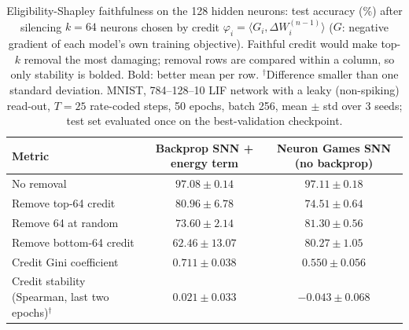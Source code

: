 \documentclass{article}
\begin{document}
\begin{table}[H]
\centering
\small
\caption{Eligibility-Shapley faithfulness on the 128 hidden neurons: test accuracy (\%) after silencing $k=64$ neurons chosen by credit $\varphi_i = \langle G_i, \Delta W_i^{(n-1)} \rangle$ ($G$: negative gradient of each model's own training objective). Faithful credit would make top-$k$ removal the most damaging; removal rows are compared within a column, so only stability is bolded. Bold: better mean per row. $^\dagger$Difference smaller than one standard deviation. MNIST, 784--128--10 LIF network with a leaky (non-spiking) read-out, $T=25$ rate-coded steps, 50 epochs, batch 256, mean $\pm$ std over 3 seeds; test set evaluated once on the best-validation checkpoint.}
\label{tab:t2-explain}
\begin{tabular}{lcc}
\toprule
Metric & Backprop SNN + energy term & Neuron Games SNN (no backprop) \\
\midrule
No removal & $97.08 \pm 0.14$ & $97.11 \pm 0.18$ \\
Remove top-64 credit & $80.96 \pm 6.78$ & $74.51 \pm 0.64$ \\
Remove 64 at random & $73.60 \pm 2.14$ & $81.30 \pm 0.56$ \\
Remove bottom-64 credit & $62.46 \pm 13.07$ & $80.27 \pm 1.05$ \\
\midrule
Credit Gini coefficient & $0.711 \pm 0.038$ & $0.550 \pm 0.056$ \\
Credit stability (Spearman, last two epochs)$^\dagger$ & $\boldsymbol{0.021 \pm 0.033}$ & $-0.043 \pm 0.068$ \\
\bottomrule
\end{tabular}
\end{table}
\end{document}
